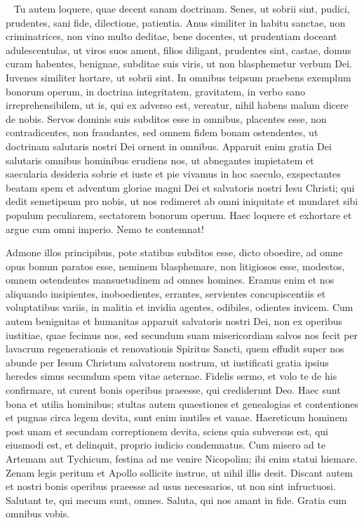 \begin{biblechapter}    
\verse Tu autem loquere, quae decent sanam doctrinam. 
\verse Senes, ut sobrii sint, pudici, prudentes, sani fide, dilectione, patientia. 
\verse Anus similiter in habitu sanctae, non criminatrices, non vino multo deditae, bene docentes, 
\verse ut prudentiam doceant adulescentulas, ut viros suos ament, filios diligant, 
\verse prudentes sint, castae, domus curam habentes, benignae, subditae suis viris, ut non blasphemetur verbum Dei. 
\verse Iuvenes similiter hortare, ut sobrii sint. 
\verse In omnibus teipsum praebens exemplum bonorum operum, in doctrina integritatem, gravitatem, 
\verse in verbo sano irreprehensibilem, ut is, qui ex adverso est, vereatur, nihil habens malum dicere de nobis. 
\verse Servos dominis suis subditos esse in omnibus, placentes esse, non contradicentes, 
\verse non fraudantes, sed omnem fidem bonam ostendentes, ut doctrinam salutaris nostri Dei ornent in omnibus. 
\verse Apparuit enim gratia Dei salutaris omnibus hominibus 
\verse erudiens nos, ut abnegantes impietatem et saecularia desideria sobrie et iuste et pie vivamus in hoc saeculo, 
\verse exspectantes beatam spem et adventum gloriae magni Dei et salvatoris nostri Iesu Christi; 
\verse qui dedit semetipsum pro nobis, ut nos redimeret ab omni iniquitate et mundaret sibi populum peculiarem, sectatorem bonorum operum. 
\verse Haec loquere et exhortare et argue cum omni imperio. Nemo te contemnat! 
\end{biblechapter}

\begin{biblechapter}  
\verse Admone illos principibus, pote statibus subditos esse, dicto oboedire, ad omne opus bonum paratos esse, 
\verse neminem blasphemare, non litigiosos esse, modestos, omnem ostendentes mansuetudinem ad omnes homines. 
\verse Eramus enim et nos aliquando insipientes, inoboedientes, errantes, servientes concupiscentiis et voluptatibus variis, in malitia et invidia agentes, odibiles, odientes invicem. 
\verse Cum autem benignitas et humanitas apparuit salvatoris nostri Dei, 
\verse non ex operibus iustitiae, quae fecimus nos, sed secundum suam misericordiam salvos nos fecit per lavacrum regenerationis et renovationis Spiritus Sancti, 
\verse quem effudit super nos abunde per Iesum Christum salvatorem nostrum, 
\verse ut iustificati gratia ipsius heredes simus secundum spem vitae aeternae. 
\verse Fidelis sermo, et volo te de his confirmare, ut curent bonis operibus praeesse, qui crediderunt Deo. Haec sunt bona et utilia hominibus; 
\verse stultas autem quaestiones et genealogias et contentiones et pugnas circa legem devita, sunt enim inutiles et vanae. 
\verse Haereticum hominem post unam et secundam correptionem devita, 
\verse sciens quia subversus est, qui eiusmodi est, et delinquit, proprio iudicio condemnatus. 
\verse Cum misero ad te Artemam aut Tychicum, festina ad me venire Nicopolim; ibi enim statui hiemare. 
\verse Zenam legis peritum et Apollo sollicite instrue, ut nihil illis desit. 
\verse Discant autem et nostri bonis operibus praeesse ad usus necessarios, ut non sint infructuosi. 
\verse Salutant te, qui mecum sunt, omnes. Saluta, qui nos amant in fide. Gratia cum omnibus vobis.
\end{biblechapter}
